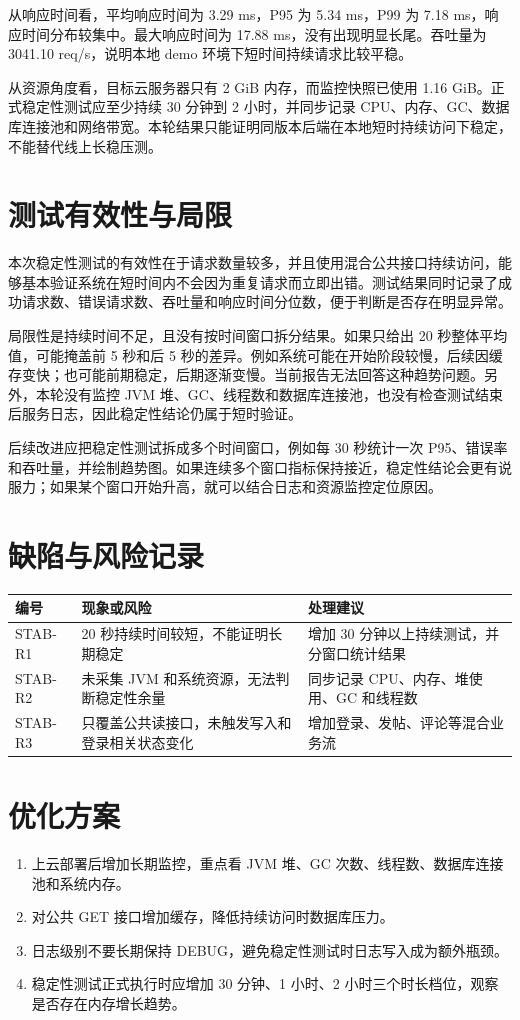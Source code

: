\documentclass[UTF8,a4paper,12pt]{ctexart}
\begin{document}
从响应时间看，平均响应时间为 3.29 ms，P95 为 5.34 ms，P99 为 7.18 ms，响应时间分布较集中。最大响应时间为 17.88 ms，没有出现明显长尾。吞吐量为 3041.10 req/s，说明本地 demo 环境下短时间持续请求比较平稳。

从资源角度看，目标云服务器只有 2 GiB 内存，而监控快照已使用 1.16 GiB。正式稳定性测试应至少持续 30 分钟到 2 小时，并同步记录 CPU、内存、GC、数据库连接池和网络带宽。本轮结果只能证明同版本后端在本地短时持续访问下稳定，不能替代线上长稳压测。

\section{测试有效性与局限}
本次稳定性测试的有效性在于请求数量较多，并且使用混合公共接口持续访问，能够基本验证系统在短时间内不会因为重复请求而立即出错。测试结果同时记录了成功请求数、错误请求数、吞吐量和响应时间分位数，便于判断是否存在明显异常。

局限性是持续时间不足，且没有按时间窗口拆分结果。如果只给出 20 秒整体平均值，可能掩盖前 5 秒和后 5 秒的差异。例如系统可能在开始阶段较慢，后续因缓存变快；也可能前期稳定，后期逐渐变慢。当前报告无法回答这种趋势问题。另外，本轮没有监控 JVM 堆、GC、线程数和数据库连接池，也没有检查测试结束后服务日志，因此稳定性结论仍属于短时验证。

后续改进应把稳定性测试拆成多个时间窗口，例如每 30 秒统计一次 P95、错误率和吞吐量，并绘制趋势图。如果连续多个窗口指标保持接近，稳定性结论会更有说服力；如果某个窗口开始升高，就可以结合日志和资源监控定位原因。

\section{缺陷与风险记录}
\begin{longtable}{P{2.0cm}P{5.5cm}P{5.8cm}}
\toprule
编号 & 现象或风险 & 处理建议\\
\midrule
STAB-R1 & 20 秒持续时间较短，不能证明长期稳定 & 增加 30 分钟以上持续测试，并分窗口统计结果\\
STAB-R2 & 未采集 JVM 和系统资源，无法判断稳定性余量 & 同步记录 CPU、内存、堆使用、GC 和线程数\\
STAB-R3 & 只覆盖公共读接口，未触发写入和登录相关状态变化 & 增加登录、发帖、评论等混合业务流\\
\bottomrule
\end{longtable}

\section{优化方案}
\begin{enumerate}
\item 上云部署后增加长期监控，重点看 JVM 堆、GC 次数、线程数、数据库连接池和系统内存。
\item 对公共 GET 接口增加缓存，降低持续访问时数据库压力。
\item 日志级别不要长期保持 DEBUG，避免稳定性测试时日志写入成为额外瓶颈。
\item 稳定性测试正式执行时应增加 30 分钟、1 小时、2 小时三个时长档位，观察是否存在内存增长趋势。
\end{enumerate}
\end{document}
